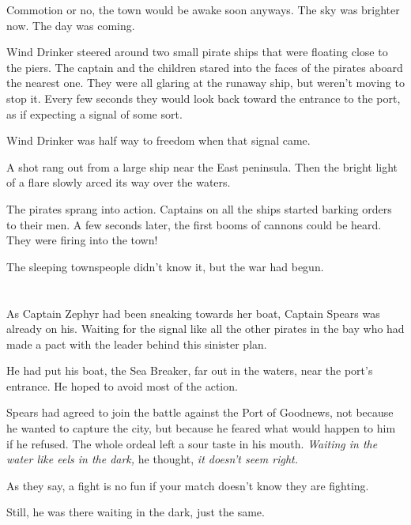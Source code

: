\documentclass[12pt]{extbook}
\begin{document}
  Commotion or no, the town would be awake soon anyways. The sky was
  brighter now. The day was coming.
  
  Wind Drinker steered around two small pirate ships that were floating
  close to the piers. The captain and the children stared into the faces
  of the pirates aboard the nearest one. They were all glaring at the
  runaway ship, but weren't moving to stop it. Every few seconds they
  would look back toward the entrance to the port, as if expecting a
  signal of some sort.
  
  Wind Drinker was half way to freedom when that signal came.
  
  A shot rang out from a large ship near the East peninsula. Then the
  bright light of a flare slowly arced its way over the waters.
  
  The pirates sprang into action. Captains on all the ships started
  barking orders to their men. A few seconds later, the first booms of
  cannons could be heard. They were firing into the town!
  
  The sleeping townspeople didn't know it, but the war had begun.
  
  \section{}\label{section-40}
  
  As Captain Zephyr had been sneaking towards her boat, Captain Spears was
  already on his. Waiting for the signal like all the other pirates in the
  bay who had made a pact with the leader behind this sinister plan.
  
  He had put his boat, the Sea Breaker, far out in the waters, near the
  port's entrance. He hoped to avoid most of the action.
  
  Spears had agreed to join the battle against the Port of Goodnews, not
  because he wanted to capture the city, but because he feared what would
  happen to him if he refused. The whole ordeal left a sour taste in his
  mouth. \emph{Waiting in the water like eels in the dark,} he thought,
  \emph{it doesn't seem right.}
  
  As they say, a fight is no fun if your match doesn't know they are
  fighting.
  
  Still, he was there waiting in the dark, just the same.
  
\end{document}
